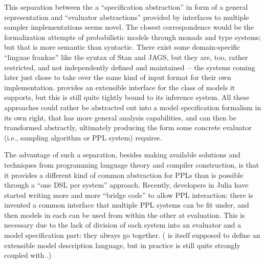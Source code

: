 This separation between the a \enquote{specification abstraction} in form of a general
representation and \enquote{evaluator abstractions} provided by interfaces to multiple sampler
implementations seems novel.  The closest correspondence would be the formalization attempts of
probabilistic models through monads and type systems; but that is more semantic than syntactic.
There exist some domain-specific \enquote{linguae frankae} like the syntax of Stan and JAGS, but
they are, too, rather restricted, and not independently defined and maintained~-- the systems coming
later just chose to take over the same kind of input format for their own implementation.
 \parencite{cusumano-towner2020gen} provides an extensible interface for the
class of models it supports, but this is still quite tightly bound to its inference system.  All
these approaches could rather be abstracted out into a model specification formalism in its own
right, that has more general analysis capabilities, and can then be transformed abstractly,
ultimately producing the form some concrete evaluator (i.e., sampling algorithm or PPL system)
requires.

The advantage of such a separation, besides making available solutions and techniques from
programming language theory and compiler construction, is that it provides a different kind of common
abstraction for PPLs than is possible through a \enquote{one DSL per system} approach.  Recently,
developers in Julia have started writing more and more \enquote{bridge code} to allow PPL
interaction: there is invented a common interface that multiple PPL systems can be fit under, and
then models in each can be used from within the other at evaluation.  This is necessary due to the
lack of division of each system into an evaluator and a model specification part: they always go
together.  (\dppljl{} is itself supposed to define an extensible model description language, but in
practice is still quite strongly coupled with \turingjl{}.)

